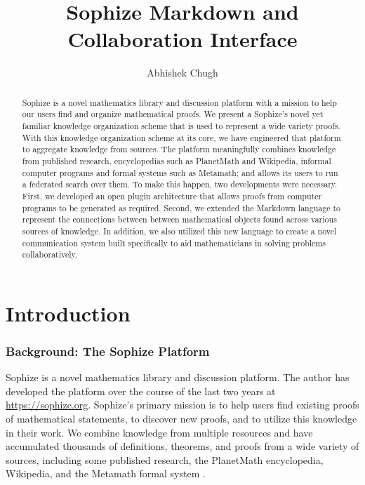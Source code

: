 \documentclass[a4paper]{article}
\title{Sophize Markdown and Collaboration Interface }
\author{ Abhishek Chugh }
\begin{document}
\maketitle

\begin{abstract}
Sophize is a novel mathematics library and discussion platform with a mission to help our users find and organize mathematical proofs. We present a Sophize's novel yet familiar knowledge organization scheme that is used to represent a wide variety proofs. With this knowledge organization scheme at its core, we have engineered that platform to aggregate knowledge from sources. The platform meaningfully combines knowledge from published research, encyclopedias such as PlanetMath and Wikipedia, informal computer programs and formal systems such as Metamath; and allows its users to run a federated search over them. To make this happen, two developments were necessary. First, we developed an open plugin architecture that allows proofs from computer programs to be generated as required. Second, we extended the Markdown language to represent the connections between between mathematical objects found across various sources of knowledge. In addition, we also utilized this new language to create a novel communication system built specifically to aid mathematicians in solving problems collaboratively.

\end{abstract}

\vskip 32pt

\section{Introduction}

\subsubsection*{Background: The Sophize Platform}

Sophize is a novel mathematics library and discussion platform. The author has developed the platform over the course of the last two years at \url{https://sophize.org}. Sophize's primary mission is to help users find existing proofs of mathematical statements, to discover new proofs, and to utilize this knowledge in their work. We combine knowledge from multiple resources and have accumulated thousands of definitions, theorems, and proofs from a wide variety of sources, including some published research, the PlanetMath encyclopedia, Wikipedia, and the Metamath formal system \cite{metamath}.
\end{document}
